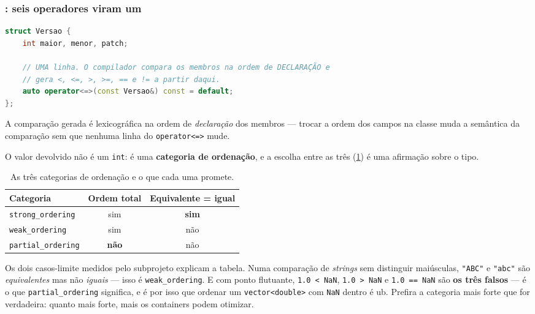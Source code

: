 \subsubsection{: seis operadores viram um}

\begin{lstlisting}[style=bt, language=C++,
    caption={Comparação total em uma linha, em
             \texttt{src/operators/demo\_comparacao.hpp}.}]
struct Versao {
    int maior, menor, patch;

    // UMA linha. O compilador compara os membros na ordem de DECLARAÇÃO e
    // gera <, <=, >, >=, == e != a partir daqui.
    auto operator<=>(const Versao&) const = default;
};
\end{lstlisting}

A comparação gerada é lexicográfica na ordem de \emph{declaração} dos membros
--- trocar a ordem dos campos na classe muda a semântica da comparação sem que
nenhuma linha do \texttt{operator<=>} mude.

O valor devolvido não é um \texttt{int}: é uma \textbf{categoria de ordenação},
e a escolha entre as três (\cref{tab:ordenacao}) é uma afirmação sobre o tipo.

\begin{table}[htbp]
\centering
\caption{As três categorias de ordenação e o que cada uma promete.}
\label{tab:ordenacao}
\footnotesize
\begin{tabular}{@{}lcc@{}}
\toprule
\textbf{Categoria} & \textbf{Ordem total} & \textbf{Equivalente = igual} \\
\midrule
\texttt{strong\_ordering}  & sim & \textbf{sim} \\
\texttt{weak\_ordering}    & sim & não \\
\texttt{partial\_ordering} & \textbf{não} & não \\
\bottomrule
\end{tabular}
\end{table}

Os dois casos-limite medidos pelo subprojeto explicam a tabela. Numa comparação
de \emph{strings} sem distinguir maiúsculas, \texttt{"ABC"} e \texttt{"abc"} são
\emph{equivalentes} mas não \emph{iguais} --- isso é \texttt{weak\_ordering}. E
com ponto flutuante, \texttt{1.0 < NaN}, \texttt{1.0 > NaN} e \texttt{1.0 == NaN}
são \textbf{os três falsos} --- é o que \texttt{partial\_ordering} significa, e é
por isso que ordenar um \texttt{vector<double>} com \texttt{NaN} dentro é
\gls{ub}. Prefira a categoria mais forte que for verdadeira: quanto mais forte,
mais os containers podem otimizar.

